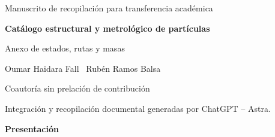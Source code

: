 \documentclass[a4paper,10pt]{article}
\begin{document}
\thispagestyle{empty}
\begin{center}
{\fontsize{8}{10}\selectfont Manuscrito de recopilación para transferencia académica\par}
\vspace{12mm}
{\fontsize{17}{20.5}\selectfont\bfseries Catálogo estructural y metrológico de partículas\par}
\vspace{6pt}
{\fontsize{11}{13.5}\selectfont Anexo de estados, rutas y masas\par}
\vspace{11pt}
{\fontsize{11.5}{14}\selectfont Oumar Haidara Fall \textperiodcentered\ Rubén Ramos Balsa\par}
\vspace{4pt}
{\fontsize{8}{10}\selectfont Coautoría sin prelación de contribución\par}
\vspace{3pt}
{\fontsize{7.5}{9.5}\selectfont Integración y recopilación documental generadas por ChatGPT -- Astra.\par}
\end{center}
\vspace{7pt}
\begin{center}\bfseries Presentación\end{center}
\begingroup
\fontsize{10.5}{12.8}\selectfont
\setlength{\parskip}{2pt plus 1pt minus .5pt}
\noindent
\end{document}
